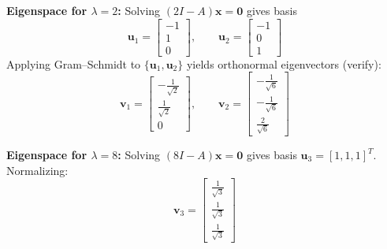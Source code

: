 \documentclass{article}
\theoremstyle{mystyle}
\begin{document}
\textbf{Eigenspace for $\lambda=2$:} Solving $(2I-A)\mathbf{x}=\mathbf{0}$ gives basis
\begin{equation}
  \mathbf{u}_1 = \begin{bmatrix}-1\\1\\0\end{bmatrix}, \qquad
  \mathbf{u}_2 = \begin{bmatrix}-1\\0\\1\end{bmatrix} \tag{5}
\end{equation}
Applying Gram--Schmidt to $\{\mathbf{u}_1,\mathbf{u}_2\}$ yields orthonormal eigenvectors (verify):
\begin{equation}
  \mathbf{v}_1 = \begin{bmatrix}-\tfrac{1}{\sqrt{2}}\\[3pt]\tfrac{1}{\sqrt{2}}\\[3pt]0\end{bmatrix},
  \qquad
  \mathbf{v}_2 = \begin{bmatrix}-\tfrac{1}{\sqrt{6}}\\[3pt]-\tfrac{1}{\sqrt{6}}\\[3pt]\tfrac{2}{\sqrt{6}}\end{bmatrix}
  \tag{6}
\end{equation}

\textbf{Eigenspace for $\lambda=8$:} Solving $(8I-A)\mathbf{x}=\mathbf{0}$ gives basis
$\mathbf{u}_3=[1,1,1]^T$. Normalizing:
\[
  \mathbf{v}_3 = \begin{bmatrix}\tfrac{1}{\sqrt{3}}\\[3pt]\tfrac{1}{\sqrt{3}}\\[3pt]\tfrac{1}{\sqrt{3}}\end{bmatrix}
\]
\end{document}
